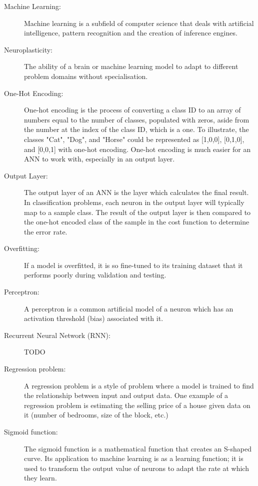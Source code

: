 \documentclass[]{report}
\begin{document}
\begin{description}
\item[Machine Learning:] Machine learning is a subfield of computer science that deals with artificial intelligence, pattern recognition and the creation of inference engines.

\item[Neuroplasticity:] The ability of a brain or machine learning model to adapt to different problem domains without specialisation.

\item[One-Hot Encoding:] One-hot encoding is the process of converting a class ID to an array of numbers equal to the number of classes, populated with zeros, aside from the number at the index of the class ID, which is a one. To illustrate, the classes "Cat", "Dog", and "Horse" could be represented as [1,0,0], [0,1,0], and [0,0,1] with one-hot encoding. One-hot encoding is much easier for an ANN to work with, especially in an output layer.

\item[Output Layer:] The output layer of an ANN is the layer which calculates the final result. In classification problems, each neuron in the output layer will typically map to a sample class. The result of the output layer is then compared to the one-hot encoded class of the sample in the cost function to determine the error rate.

\item[Overfitting:] If a model is overfitted, it is so fine-tuned to its training dataset that it performs poorly during validation and testing.

\item[Perceptron:] A perceptron is a common artificial model of a neuron which has an activation threshold (bias) associated with it.

\item[Recurrent Neural Network (RNN):] TODO

\item[Regression problem:] A regression problem is a style of problem where a model is trained to find the relationship between input and output data. One example of a regression problem is estimating the selling price of a house given data on it (number of bedrooms, size of the block, etc.)

\item[Sigmoid function:] The sigmoid function is a mathematical function that creates an S-shaped curve. Its application to machine learning is as a learning function; it is used to transform the output value of neurons to adapt the rate at which they learn.


\end{description}
\end{document}
